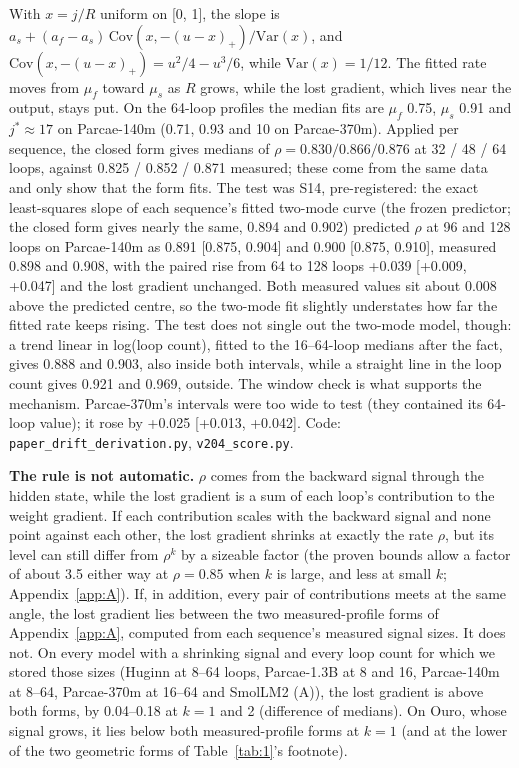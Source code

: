 \documentclass[10pt]{article}
\begin{document}
With $x = j/R$ uniform on [0, 1], the slope is $a_s + (a_f - a_s)\,\mathrm{Cov}(x, -(u-x)_+)/\mathrm{Var}(x)$, and $\mathrm{Cov}(x, -(u-x)_+) = u^2/4 - u^3/6$, while $\mathrm{Var}(x) = 1/12$. The fitted rate moves from $\mu_f$ toward $\mu_s$ as $R$ grows, while the lost gradient, which lives near the output, stays put. On the 64-loop profiles the median fits are $\mu_f$ 0.75, $\mu_s$ 0.91 and $j^* \approx 17$ on Parcae-140m (0.71, 0.93 and 10 on Parcae-370m). Applied per sequence, the closed form gives medians of $\rho = 0.830 / 0.866 / 0.876$ at 32 / 48 / 64 loops, against 0.825 / 0.852 / 0.871 measured; these come from the same data and only show that the form fits. The test was S14, pre-registered: the exact least-squares slope of each sequence's fitted two-mode curve (the frozen predictor; the closed form gives nearly the same, 0.894 and 0.902) predicted $\rho$ at 96 and 128 loops on Parcae-140m as 0.891 [0.875, 0.904] and 0.900 [0.875, 0.910], measured 0.898 and 0.908, with the paired rise from 64 to 128 loops +0.039 [+0.009, +0.047] and the lost gradient unchanged. Both measured values sit about 0.008 above the predicted centre, so the two-mode fit slightly understates how far the fitted rate keeps rising. The test does not single out the two-mode model, though: a trend linear in log(loop count), fitted to the 16--64-loop medians after the fact, gives 0.888 and 0.903, also inside both intervals, while a straight line in the loop count gives 0.921 and 0.969, outside. The window check is what supports the mechanism. Parcae-370m's intervals were too wide to test (they contained its 64-loop value); it rose by +0.025 [+0.013, +0.042]. Code: \texttt{paper\_drift\_derivation.py}, \texttt{v204\_score.py}.

\textbf{The rule is not automatic.} $\rho$ comes from the backward signal through the hidden state, while the lost gradient is a sum of each loop's contribution to the weight gradient. If each contribution scales with the backward signal and none point against each other, the lost gradient shrinks at exactly the rate $\rho$, but its level can still differ from $\rho^{k}$ by a sizeable factor (the proven bounds allow a factor of about 3.5 either way at $\rho = 0.85$ when $k$ is large, and less at small $k$; Appendix~\ref{app:A}). If, in addition, every pair of contributions meets at the same angle, the lost gradient lies between the two measured-profile forms of Appendix~\ref{app:A}, computed from each sequence's measured signal sizes. It does not. On every model with a shrinking signal and every loop count for which we stored those sizes (Huginn at 8--64 loops, Parcae-1.3B at 8 and 16, Parcae-140m at 8--64, Parcae-370m at 16--64 and SmolLM2 (A)), the lost gradient is above both forms, by 0.04--0.18 at $k = 1$ and 2 (difference of medians). On Ouro, whose signal grows, it lies below both measured-profile forms at $k = 1$ (and at the lower of the two geometric forms of Table~\ref{tab:1}'s footnote).
\end{document}
